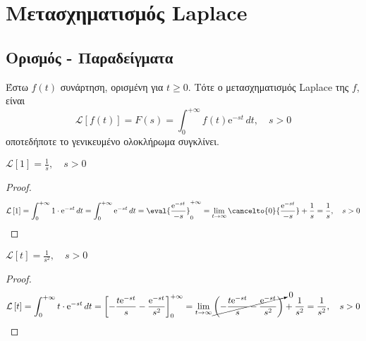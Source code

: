 



\pagestyle{vangelis}
\everymath{\displaystyle}

\renewcommand{\qedsymbol}{}



\chapter*{Μετασχηματισμός Laplace}

\vspace{\baselineskip}


\section*{Ορισμός - Παραδείγματα}

\begin{dfn}
  Έστω $ f(t) $ συνάρτηση, ορισμένη για $ t \geq 0 $. Τότε ο μετασχηματισμός Laplace 
  της $f$, είναι
  \begin{equation}\label{eq:laplace}
    \mathcal{L} \left[f(t)\right] = F(s) = \int _{0}^{+\infty} f(t) 
    \mathrm{e}^{-st} \,{dt}, \quad s>0
  \end{equation} 
  οποτεδήποτε το γενικευμένο ολοκλήρωμα συγκλίνει.
\end{dfn}

\begin{example}
  $ \mathcal{L}\left[1\right] = \frac{1}{s}, \quad s > 0 $
\end{example}
\begin{proof}
  \[
    \mathcal{L}\left[1\right] = \int_{0}^{+\infty} 1\cdot \mathrm{e}^{-st} \,{dt} =  
    \int_{0}^{+\infty} \mathrm{e}^{-st} \,{dt} = \eval{\frac{\mathrm{e}^{-st}}{-s}}
    _{0}^{+\infty} = \lim_{t \to \infty} \cancelto{0}{\frac{\mathrm{e}^{-st}}{-s}} 
    + \frac{1}{s} = \frac{1}{s} , \quad s>0 
  \] 
\end{proof}

\begin{example}
  $ \mathcal{L}\left[t\right] = \frac{1}{s^{2}}, \quad s>0 $
\end{example}
\begin{proof}
  \[
    \mathcal{L}\left[t\right] = \int_{0}^{+\infty} t \cdot \mathrm{e}^{-st} \,{dt} = 
    \left[-\frac{t \mathrm{e}^{-st}}{s} - \frac{\mathrm{e}^{-st}}{s^{2}}\right]
    _{0}^{+\infty} = \lim_{t \to \infty} 
    \cancelto{0}{\left(- \frac{t\mathrm{e}^{-st}}{s} -
    \frac{\mathrm{e}^{-st}}{s^{2}}\right)} + \frac{1}{s^{2}} = \frac{1}{s^{2}} , 
    \quad s>0
  \] 
\end{proof}

